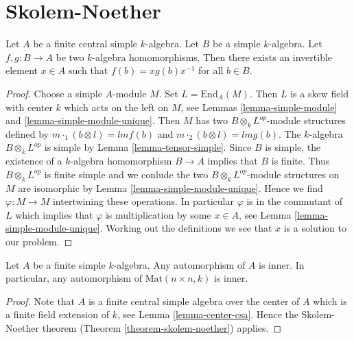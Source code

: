 \section{Skolem-Noether}
\label{section-skolem-noether}



\begin{theorem}
\label{theorem-skolem-noether}
Let $A$ be a finite central simple $k$-algebra. Let $B$ be a simple
$k$-algebra. Let $f, g : B \to A$ be two $k$-algebra homomorphisms.
Then there exists an invertible element $x \in A$ such that
$f(b) = xg(b)x^{-1}$ for all $b \in B$.
\end{theorem}

\begin{proof}
Choose a simple $A$-module $M$. Set $L = \text{End}_A(M)$.
Then $L$ is a skew field with center $k$ which acts on the left on $M$, see
Lemmas \ref{lemma-simple-module} and \ref{lemma-simple-module-unique}.
Then $M$ has two $B \otimes_k L^{op}$-module structures defined by
$m \cdot_1 (b \otimes l) = lmf(b)$ and $m \cdot_2 (b \otimes l) = lmg(b)$.
The $k$-algebra $B \otimes_k L^{op}$ is simple by
Lemma \ref{lemma-tensor-simple}. Since $B$ is simple, the existence of a
$k$-algebra homomorphism $B \to A$ implies that $B$ is finite. Thus
$B \otimes_k L^{op}$ is finite simple and we conlude the two
$B \otimes_k L^{op}$-module structures on $M$
are isomorphic by Lemma \ref{lemma-simple-module-unique}.
Hence we find $\varphi : M \to M$ intertwining these operations.
In particular $\varphi$ is in the commutant of $L$ which implies that
$\varphi$ is multiplication by some $x \in A$, see
Lemma \ref{lemma-simple-module-unique}. Working out the definitions we see
that $x$ is a solution to our problem.
\end{proof}

\begin{lemma}
\label{lemma-automorphism-inner}
Let $A$ be a finite simple $k$-algebra. Any automorphism of $A$ is
inner. In particular, any automorphism of $\text{Mat}(n \times n, k)$
is inner.
\end{lemma}

\begin{proof}
Note that $A$ is a finite central simple algebra over the center
of $A$ which is a finite field extension of $k$, see
Lemma \ref{lemma-center-csa}.
Hence the Skolem-Noether theorem (Theorem \ref{theorem-skolem-noether})
applies.
\end{proof}



